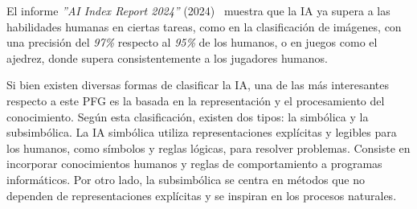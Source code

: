 El informe \textit{''AI Index Report 2024''} (2024)~\cite{aiindex2024} muestra que la IA ya supera a las habilidades humanas en ciertas tareas, como en la clasificación de imágenes, con una precisión del \textit{97\%} respecto al \textit{95\%} de los humanos, o en juegos como el ajedrez, donde supera consistentemente a los jugadores humanos.

Si bien existen diversas formas de clasificar la IA, una de las más interesantes respecto a este PFG es la basada en la representación y el procesamiento del conocimiento. Según esta clasificación, existen dos tipos: la simbólica y la subsimbólica. La IA simbólica utiliza representaciones explícitas y legibles para los humanos, como símbolos y reglas lógicas, para resolver problemas. Consiste en incorporar conocimientos humanos y reglas de comportamiento a programas informáticos. Por otro lado, la subsimbólica se centra en métodos que no dependen de representaciones explícitas y se inspiran en los procesos naturales.

